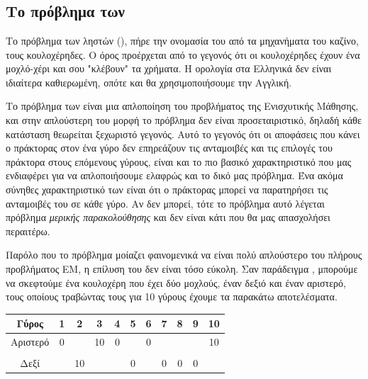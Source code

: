 \chapter{}
\section{Το πρόβλημα των }

Το πρόβλημα των ληστών (), πήρε την ονομασία του από τα μηχανήματα του καζίνο, τους κουλοχέρηδες. Ο όρος  προέρχεται από το γεγονός ότι οι κουλοχέρηδες έχουν ένα μοχλό-χέρι και σου "κλέβουν" τα χρήματα. Η ορολογία στα Ελληνικά δεν είναι ιδιαίτερα καθιερωμένη, οπότε και θα χρησιμοποιήσουμε την Αγγλική.

Το πρόβλημα των  είναι μια απλοποίηση του προβλήματος της Ενισχυτικής Μάθησης, και στην απλούστερη του μορφή το πρόβλημα δεν είναι προσεταιριστικό, δηλαδή κάθε κατάσταση θεωρείται ξεχωριστό γεγονός. Αυτό το γεγονός ότι οι αποφάσεις που κάνει ο πράκτορας στον ένα γύρο δεν επηρεάζουν τις ανταμοιβές και τις επιλογές του πράκτορα στους επόμενους γύρους, είναι και το πιο βασικό χαρακτηριστικό που μας ενδιαφέρει για να απλοποιήσουμε ελαφρώς και το δικό μας πρόβλημα. Ένα ακόμα σύνηθες χαρακτηριστικό των  είναι ότι ο πράκτορας μπορεί να παρατηρήσει τις ανταμοιβές του σε κάθε γύρο. Αν δεν μπορεί, τότε το πρόβλημα αυτό λέγεται πρόβλημα \textit{μερικής παρακολούθησης} και δεν είναι κάτι που θα μας απασχολήσει περαιτέρω.

Παρόλο που το πρόβλημα μοίαζει φαινομενικά να είναι πολύ απλούστερο του πλήρους προβλήματος ΕΜ, η επίλυση του δεν είναι τόσο εύκολη. Σαν παράδειγμα \cite{lattimore2020bandit}, μπορούμε να σκεφτούμε ένα κουλοχέρη που έχει δύο μοχλούς, έναν δεξιό και έναν αριστερό, τους οποίους τραβώντας τους για 10 γύρους έχουμε τα παρακάτω αποτελέσματα.

\begin{center}
    \begin{tabular}{ccccccccccc}
        \hline
        Γύρος    & 1 & 2  & 3  & 4 & 5 & 6 & 7 & 8 & 9 & 10 \\
        \hline
        Αριστερό & 0 &    & 10 & 0 &   & 0 &   &   &   & 10 \\ \\
        Δεξί     &   & 10 &    &   & 0 &   & 0 & 0 & 0 &    \\
        \hline
    \end{tabular}
\end{center}

